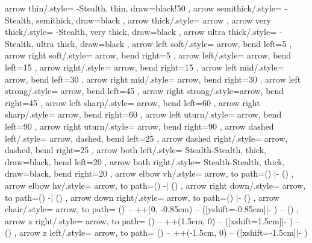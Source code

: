 {	%
	arrow thin/.style={
		-Stealth, thin, draw=black!50
	},
	arrow semithick/.style={
		-Stealth, semithick, draw=black
	},
	arrow thick/.style={
		arrow
	},
	arrow very thick/.style={
		-Stealth, very thick, draw=black
	},
	arrow ultra thick/.style={
		-Stealth, ultra thick, draw=black
	},
	arrow left soft/.style={  arrow, bend left=5  },
	arrow right soft/.style={ arrow, bend right=5 },
	arrow left/.style={       arrow, bend left=15  },
	arrow right/.style={      arrow, bend right=15 },
	arrow left mid/.style={   arrow, bend left=30  },
	arrow right mid/.style={  arrow, bend right=30 },
	arrow left strong/.style={ arrow, bend left=45  },
	arrow right strong/.style={arrow, bend right=45 },
	arrow left sharp/.style={  arrow, bend left=60  },
	arrow right sharp/.style={ arrow, bend right=60 },
	arrow left uturn/.style={  arrow, bend left=90  },
	arrow right uturn/.style={ arrow, bend right=90 },
	arrow dashed left/.style={  arrow, dashed, bend left=25  },
	arrow dashed right/.style={ arrow, dashed, bend right=25 },
	arrow both left/.style={  Stealth-Stealth, thick, draw=black, bend left=20  },
	arrow both right/.style={ Stealth-Stealth, thick, draw=black, bend right=20 },
	arrow elbow vh/.style={
		arrow,
		to path={(\tikztostart) |- (\tikztotarget)}
	},
	arrow elbow hv/.style={
		arrow,
		to path={(\tikztostart) -| (\tikztotarget)}
	},
	arrow right down/.style={
		arrow,
		to path={(\tikztostart) -| (\tikztotarget)}
	},
	arrow down right/.style={
		arrow,
		to path={(\tikztostart) |- (\tikztotarget)}
	},
	arrow chair/.style={
		arrow,
		to path={
			(\tikztostart)
			-- ++(0, -0.85cm)
			-- ([yshift=-0.85cm]\tikztotarget |- \tikztostart)
			-- (\tikztotarget)
		}
	},
	arrow z right/.style={
		arrow,
		to path={
			(\tikztostart)
			-- ++(1.5cm, 0)
			-- ([xshift=1.5cm]\tikztostart |- \tikztotarget)
			-- (\tikztotarget)
		}
	},
	arrow z left/.style={
		arrow,
		to path={
			(\tikztostart)
			-- ++(-1.5cm, 0)
			-- ([xshift=-1.5cm]\tikztostart |- \tikztotarget)
}}}
